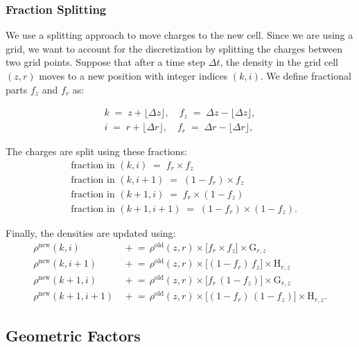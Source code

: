 \subsubsection*{Fraction Splitting}\label{ch3:sec:frac_split}
We use a splitting approach to move charges to the new cell. Since we are using a grid, we want to account for the discretization by splitting the charges between two grid points. Suppose that after a time step $\Delta t$, the density in the grid cell $(z,r)$ moves to a new position with integer indices $(k,i)$. We define fractional parts $f_z$ and $f_r$ as:

\begin{align}
k \;=\; z + \lfloor \Delta z \rfloor,\quad
f_z \;=\; \Delta z - \lfloor \Delta z \rfloor,\\
i \;=\; r + \lfloor \Delta r \rfloor,\quad
f_r \;=\; \Delta r - \lfloor \Delta r \rfloor,
\end{align}

\noindent
The charges are split using these fractions:
\begin{align}
&\text{fraction in }(k, i)   \;=\; f_{r} \times f_{z} \\
&\text{fraction in }(k, i+1) \;=\; (1 - f_{r}) \times f_{z}\\
&\text{fraction in }(k+1, i) \;=\; f_{r} \times (1 - f_{z})\\
&\text{fraction in }(k+1, i+1)\;=\; (1 - f_{r}) \times (1 - f_{z}).
\label{eq:bilinear-fractions}
\end{align}

\noindent
Finally, the densities are updated using:
\begin{align}
\rho^{\mathrm{new}}(k,i)   &\,\mathrel{+}=\, \rho^{\mathrm{old}}(z,r)\times \bigl[f_{r}\times f_{z}\bigr] \times \text{G}_{r,z} \label{ch3:eq:den_update_1} \\
\rho^{\mathrm{new}}(k,i+1) &\,\mathrel{+}=\, \rho^{\mathrm{old}}(z,r)\times \bigl[(1 - f_{r})\,f_{z}\bigr] \times \text{H}_{r,z} \label{ch3:eq:den_update_2} \\
\rho^{\mathrm{new}}(k+1,i) &\,\mathrel{+}=\, \rho^{\mathrm{old}}(z,r)\times \bigl[f_{r}\,(1 - f_{z})\bigr] \times \text{G}_{r,z} \label{ch3:eq:den_update_3} \\
\rho^{\mathrm{new}}(k+1,i+1)&\,\mathrel{+}=\, \rho^{\mathrm{old}}(z,r)\times \bigl[(1 - f_{r})\,(1 - f_{z})\bigr] \times \text{H}_{r,z}. \label{ch3:eq:den_update_4}
\end{align}


\subsection{Geometric Factors}
\label{sec:geom-factor}


